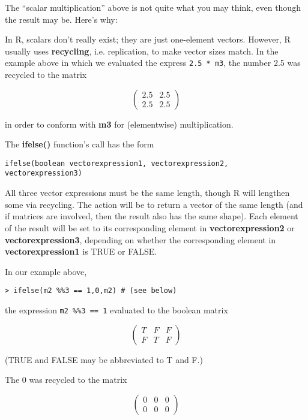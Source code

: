 The ``scalar multiplication'' above is not quite what you may think,
even though the result may be.  Here's why:

In R, scalars don't really exist; they are just one-element vectors.
However, R usually uses {\bf recycling}, i.e. replication, to make
vector sizes match.  In the example above in which we evaluated the
express \verb^2.5 * m3^, the number 2.5 was recycled to the matrix 

\begin{equation}
\left (
\begin{array}{rr}
2.5 & 2.5 \\
2.5 & 2.5 
\end{array}
\right )
\end{equation}

in order to conform with {\bf m3} for (elementwise) multiplication.

The {\bf ifelse()} function's call has the form

\begin{lstlisting}
ifelse(boolean vectorexpression1, vectorexpression2, vectorexpression3)
\end{lstlisting}

All three vector expressions must be the same length, though R will
lengthen some via recycling.  The action will be to return a vector of
the same length (and if matrices are involved, then the result also has
the same shape).  Each element of the result will be set to its
corresponding element in {\bf vectorexpression2} or {\bf
vectorexpression3}, depending on whether the corresponding element in
{\bf vectorexpression1} is TRUE or FALSE.

In our example above,

\begin{lstlisting}
> ifelse(m2 %%3 == 1,0,m2) # (see below)
\end{lstlisting}

the expression \verb^m2 %%3 == 1^ evaluated to the boolean matrix

\begin{equation}
\left (
\begin{array}{rrr}
T & F & F\\
F & T & F
\end{array}
\right )
\end{equation}

(TRUE and FALSE may be abbreviated to T and F.)

The 0 was recycled to the matrix

\begin{equation}
\left (
\begin{array}{rrr}
0 & 0 & 0 \\
0 & 0 & 0
\end{array}
\right )
\end{equation}

